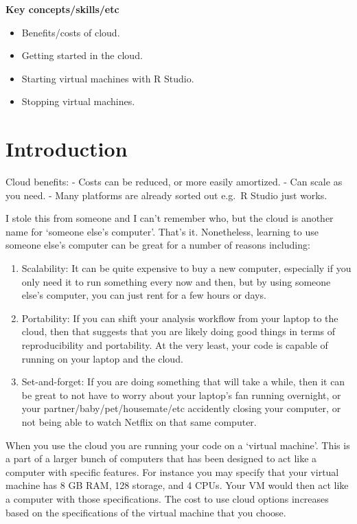\documentclass[
]{book}
\providecommand{\tightlist}{%
  \setlength{\itemsep}{0pt}\setlength{\parskip}{0pt}}
\begin{document}
\textbf{Key concepts/skills/etc}

\begin{itemize}
\tightlist
\item
  Benefits/costs of cloud.
\item
  Getting started in the cloud.
\item
  Starting virtual machines with R Studio.
\item
  Stopping virtual machines.
\end{itemize}

\hypertarget{introduction-27}{%
\section{Introduction}\label{introduction-27}}

Cloud benefits:
- Costs can be reduced, or more easily amortized.
- Can scale as you need.
- Many platforms are already sorted out e.g.~R Studio just works.

I stole this from someone and I can't remember who, but the cloud is another name for `someone else's computer'. That's it. Nonetheless, learning to use someone else's computer can be great for a number of reasons including:

\begin{enumerate}
\def\labelenumi{\arabic{enumi})}
\tightlist
\item
  Scalability: It can be quite expensive to buy a new computer, especially if you only need it to run something every now and then, but by using someone else's computer, you can just rent for a few hours or days.
\item
  Portability: If you can shift your analysis workflow from your laptop to the cloud, then that suggests that you are likely doing good things in terms of reproducibility and portability. At the very least, your code is capable of running on your laptop and the cloud.
\item
  Set-and-forget: If you are doing something that will take a while, then it can be great to not have to worry about your laptop's fan running overnight, or your partner/baby/pet/housemate/etc accidently closing your computer, or not being able to watch Netflix on that same computer.
\end{enumerate}

When you use the cloud you are running your code on a `virtual machine'. This is a part of a larger bunch of computers that has been designed to act like a computer with specific features. For instance you may specify that your virtual machine has 8 GB RAM, 128 storage, and 4 CPUs. Your VM would then act like a computer with those specifications. The cost to use cloud options increases based on the specifications of the virtual machine that you choose.
\end{document}
